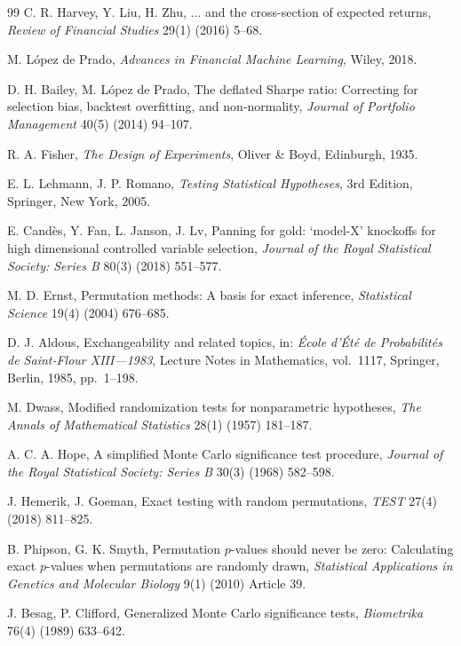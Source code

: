 \documentclass[preprint,12pt]{elsarticle}
\theoremstyle{definition}
\begin{document}
\begin{thebibliography}{99}
C. R. Harvey, Y. Liu, H. Zhu, $\ldots$ and the cross-section of expected returns,
\emph{Review of Financial Studies} 29(1) (2016) 5--68.

M. L\'opez de Prado, \emph{Advances in Financial Machine Learning}, Wiley, 2018.

D. H. Bailey, M. L\'opez de Prado, The deflated Sharpe ratio: Correcting for selection bias, backtest overfitting, and non-normality,
\emph{Journal of Portfolio Management} 40(5) (2014) 94--107.

R. A. Fisher, \emph{The Design of Experiments}, Oliver \& Boyd, Edinburgh, 1935.

E. L. Lehmann, J. P. Romano, \emph{Testing Statistical Hypotheses}, 3rd Edition, Springer, New York, 2005.

E. Cand\`es, Y. Fan, L. Janson, J. Lv, Panning for gold: `model-X' knockoffs for high dimensional controlled variable selection,
\emph{Journal of the Royal Statistical Society: Series B} 80(3) (2018) 551--577.

M. D. Ernst, Permutation methods: A basis for exact inference,
\emph{Statistical Science} 19(4) (2004) 676--685.

D. J. Aldous, Exchangeability and related topics, in: \emph{\'Ecole d'\'Et\'e de Probabilit\'es de Saint-Flour XIII---1983}, Lecture Notes in Mathematics, vol.~1117, Springer, Berlin, 1985, pp.~1--198.

M. Dwass, Modified randomization tests for nonparametric hypotheses,
\emph{The Annals of Mathematical Statistics} 28(1) (1957) 181--187.

A. C. A. Hope, A simplified Monte Carlo significance test procedure,
\emph{Journal of the Royal Statistical Society: Series B} 30(3) (1968) 582--598.

J. Hemerik, J. Goeman, Exact testing with random permutations,
\emph{TEST} 27(4) (2018) 811--825.

B. Phipson, G. K. Smyth, Permutation $p$-values should never be zero: Calculating exact $p$-values when permutations are randomly drawn,
\emph{Statistical Applications in Genetics and Molecular Biology} 9(1) (2010) Article 39.

J. Besag, P. Clifford, Generalized Monte Carlo significance tests,
\emph{Biometrika} 76(4) (1989) 633--642.


\end{thebibliography}
\end{document}
